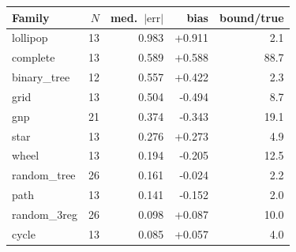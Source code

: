 \begin{tabular}{lrrrr}
\toprule
Family & $N$ & med.\ $|\mathrm{err}|$ & bias & bound/true \\
\midrule
lollipop & 13 & 0.983 & +0.911 & 2.1 \\
complete & 13 & 0.589 & +0.588 & 88.7 \\
binary\_tree & 12 & 0.557 & +0.422 & 2.3 \\
grid & 13 & 0.504 & -0.494 & 8.7 \\
gnp & 21 & 0.374 & -0.343 & 19.1 \\
star & 13 & 0.276 & +0.273 & 4.9 \\
wheel & 13 & 0.194 & -0.205 & 12.5 \\
random\_tree & 26 & 0.161 & -0.024 & 2.2 \\
path & 13 & 0.141 & -0.152 & 2.0 \\
random\_3reg & 26 & 0.098 & +0.087 & 10.0 \\
cycle & 13 & 0.085 & +0.057 & 4.0 \\
\bottomrule
\end{tabular}
